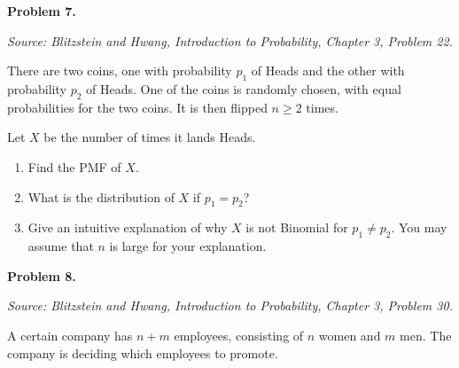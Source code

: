 \documentclass[11pt]{article}
\newcommand{\source}[1]{%
    \vspace{0.15cm}
    {\small\textit{Source: Blitzstein and Hwang, \textit{Introduction to Probability}, Chapter 3, Problem #1.}}
}
\begin{document}
\vfill


\newpage


\begin{problemheader}
\textbf{Problem 7.}
\end{problemheader}
\source{22}

There are two coins, one with probability $p_1$ of Heads and the other with probability $p_2$ of Heads. One of the coins is randomly chosen, with equal probabilities for the two coins. It is then flipped $n\ge2$ times.

Let $X$ be the number of times it lands Heads.

\begin{enumerate}[label=(\alph*), leftmargin=*]
    \item Find the PMF of $X$.

    \item What is the distribution of $X$ if $p_1=p_2$?

    \item Give an intuitive explanation of why $X$ is not Binomial for $p_1\ne p_2$. You may assume that $n$ is large for your explanation.
\end{enumerate}

\vfill



\newpage


\begin{problemheader}
\textbf{Problem 8. }
\end{problemheader}
\source{30}

A certain company has $n+m$ employees, consisting of $n$ women and $m$ men. The company is deciding which employees to promote.
\end{document}
